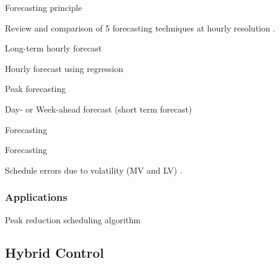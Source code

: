Forecasting principle \cite{Ramanathan1997}

Review and comparison of 5 forecasting techniques at hourly resolution \cite{Moghram1989}.

Long-term hourly forecast \cite{Filik2011}

Hourly forecast using regression \cite{Papalexopoulos1990}

Peak forecasting \cite{Barakat1990}

Day- or Week-ahead forecast (short term forecast) \cite{Hyde1997}

Forecasting \cite{Charlton2014}

Forecasting \cite{Taieb2013}

Schedule errors due to volatility (MV and LV) \cite{Haben2014}.

\subsubsection{Applications}

Peak reduction scheduling algorithm \cite{Rowe2014a}

\subsection{Hybrid Control}

%
